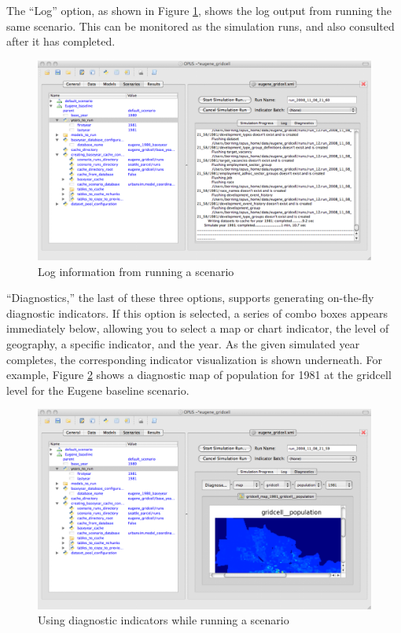 The ``Log'' option, as shown in Figure
\ref{fig:scenario-manager-log-pane.png}, shows the log output from running
the same scenario.  This can be monitored as the simulation runs, and also
consulted after it has completed.

\begin{figure}[htp]
\begin{center}
\includegraphics[scale=0.4]{part-gui/images/scenario-manager-log-pane.png}
\end{center}
\caption{Log information from running a scenario}
\label{fig:scenario-manager-log-pane.png}
\end{figure}

``Diagnostics,'' the last of these three options, supports generating
on-the-fly diagnostic indicators.  If this option is selected, a series of
combo boxes appears immediately below, allowing you to select a map or
chart indicator, the level of geography, a specific indicator, and the
year.  As the given simulated year completes, the corresponding indicator
visualization is shown underneath.  For example, Figure
\ref{fig:scenario-manager-diagnostic-map} shows a diagnostic map of population
for 1981 at the gridcell level for the Eugene baseline scenario.

\begin{figure}[htp]
\begin{center}
\includegraphics[scale=0.4]{part-gui/images/scenario-manager-diagnostic-map.png}
\end{center}
\caption{Using diagnostic indicators while running a scenario}
\label{fig:scenario-manager-diagnostic-map}
\end{figure}

